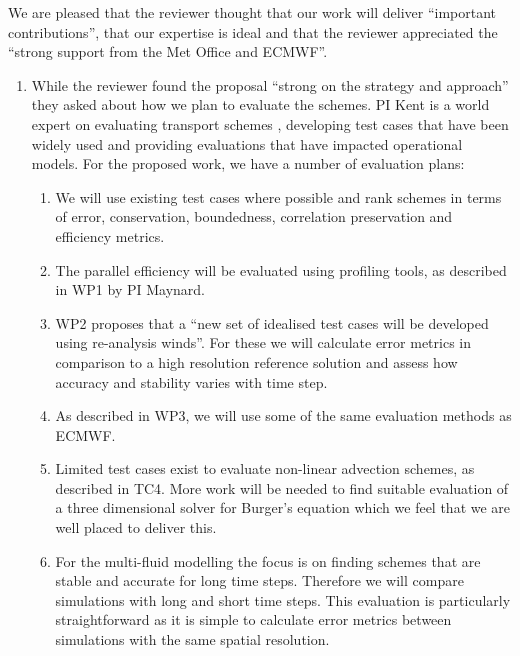 We are pleased that the reviewer thought that our work will deliver ``important contributions'', that our expertise is ideal and that the reviewer appreciated the ``strong support from the Met Office and ECMWF''. 

\begin{enumerate}
\item While the reviewer found the proposal ``strong on the strategy and approach'' they asked about how we plan to evaluate the schemes. PI Kent is a world expert on evaluating transport schemes \cite[]{KENT2014b,KENT2014c,KENT2012a,KENTHOLDAWAY,KENT2014a,DCMIP2016}, developing test cases that have been widely used and providing evaluations that have impacted operational models. For the proposed work, we have a number of evaluation plans:
    \begin{enumerate}
    \item We will use existing test cases where possible and rank schemes in terms of error, conservation, boundedness, correlation preservation and efficiency metrics. 
    \item The parallel efficiency will be evaluated using profiling tools, as described in WP1 by PI Maynard.
    \item WP2 proposes that a ``new set of idealised test cases will be developed using re-analysis winds''. For these we will calculate error metrics in comparison to a high resolution reference solution and assess how accuracy and stability varies with time step.
    \item As described in WP3, we will use some of the same evaluation methods as ECMWF.
    \item Limited test cases exist to evaluate non-linear advection schemes, as described in TC4. More work will be needed to find suitable evaluation of a three dimensional solver for Burger's equation which we feel that we are well placed to deliver this.
    \item For the multi-fluid modelling the focus is on finding schemes that are stable and accurate for long time steps. Therefore we will compare simulations with long and short time steps. This evaluation is particularly straightforward as it is simple to calculate error metrics between simulations with the same spatial resolution. 
    \end{enumerate}


\end{enumerate}
